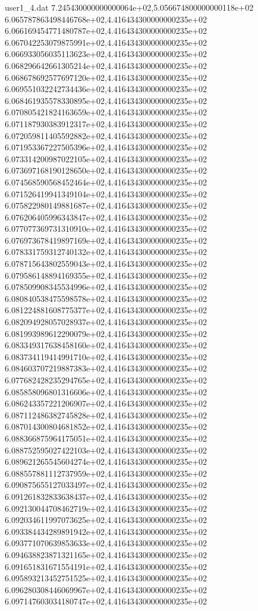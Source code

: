\begin{filecontents}{user1_4.dat}
7.245430000000000064e+02,5.056674800000000118e+02
6.065787863498446768e+02,4.416434300000000235e+02
6.066169454771480787e+02,4.416434300000000235e+02
6.067042253079875991e+02,4.416434300000000235e+02
6.066933056035113623e+02,4.416434300000000235e+02
6.068296642661305214e+02,4.416434300000000235e+02
6.068678692577697120e+02,4.416434300000000235e+02
6.069551032242734436e+02,4.416434300000000235e+02
6.068461935578330895e+02,4.416434300000000235e+02
6.070805421824163659e+02,4.416434300000000235e+02
6.071187930383912317e+02,4.416434300000000235e+02
6.072059811405592882e+02,4.416434300000000235e+02
6.071953367227505396e+02,4.416434300000000235e+02
6.073314200987022105e+02,4.416434300000000235e+02
6.073697168190128650e+02,4.416434300000000235e+02
6.074568590568452464e+02,4.416434300000000235e+02
6.071526419941349104e+02,4.416434300000000235e+02
6.075822980149881687e+02,4.416434300000000235e+02
6.076206405996343847e+02,4.416434300000000235e+02
6.077077369731310910e+02,4.416434300000000235e+02
6.076973678419897169e+02,4.416434300000000235e+02
6.078331759312740132e+02,4.416434300000000235e+02
6.078715643802559043e+02,4.416434300000000235e+02
6.079586148894169355e+02,4.416434300000000235e+02
6.078509908345534996e+02,4.416434300000000235e+02
6.080840538475598578e+02,4.416434300000000235e+02
6.081224881608775377e+02,4.416434300000000235e+02
6.082094928057028937e+02,4.416434300000000235e+02
6.081993989612290079e+02,4.416434300000000235e+02
6.083349317638458160e+02,4.416434300000000235e+02
6.083734119414991710e+02,4.416434300000000235e+02
6.084603707219887383e+02,4.416434300000000235e+02
6.077682428235294765e+02,4.416434300000000235e+02
6.085858096801316606e+02,4.416434300000000235e+02
6.086243357221206907e+02,4.416434300000000235e+02
6.087112486382745828e+02,4.416434300000000235e+02
6.087014300804681852e+02,4.416434300000000235e+02
6.088366875964175051e+02,4.416434300000000235e+02
6.088752595027422103e+02,4.416434300000000235e+02
6.089621265545604274e+02,4.416434300000000235e+02
6.088557881112737959e+02,4.416434300000000235e+02
6.090875655127033497e+02,4.416434300000000235e+02
6.091261832833638437e+02,4.416434300000000235e+02
6.092130044708462719e+02,4.416434300000000235e+02
6.092034611997073625e+02,4.416434300000000235e+02
6.093384434289891942e+02,4.416434300000000235e+02
6.093771070639853633e+02,4.416434300000000235e+02
6.094638823871321165e+02,4.416434300000000235e+02
6.091651831671554191e+02,4.416434300000000235e+02
6.095893213452751525e+02,4.416434300000000235e+02
6.096280308446069967e+02,4.416434300000000235e+02
6.097147603034180747e+02,4.416434300000000235e+02

\end{filecontents}
